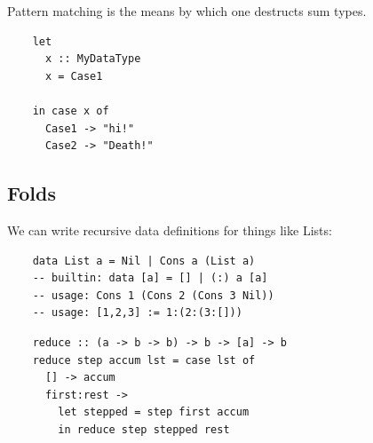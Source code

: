 \documentclass[tikz]{beamer}
\theoremstyle{definition}
\begin{document}
\begin{frame}[fragile]

Pattern matching is the means by which one destructs sum types.
\begin{center}
	\begin{verbatim}
	let 
	  x :: MyDataType
	  x = Case1
			
	in case x of 
	  Case1 -> "hi!"
	  Case2 -> "Death!"  
	\end{verbatim}
\end{center}
\end{frame}

\subsection{Folds}



\begin{frame}[fragile]
	We can write recursive data definitions for things like Lists: 

\begin{center}
	\begin{verbatim}
	data List a = Nil | Cons a (List a)
	-- builtin: data [a] = [] | (:) a [a]
	-- usage: Cons 1 (Cons 2 (Cons 3 Nil))
	-- usage: [1,2,3] := 1:(2:(3:[])) 
	\end{verbatim}
\end{center}

\end{frame}

\begin{frame}[fragile]
\begin{center}
	\begin{verbatim}
	reduce :: (a -> b -> b) -> b -> [a] -> b
	reduce step accum lst = case lst of 
	  [] -> accum 
	  first:rest -> 
	    let stepped = step first accum
	    in reduce step stepped rest
	\end{verbatim}
\end{center}

\end{frame}

\end{document}
